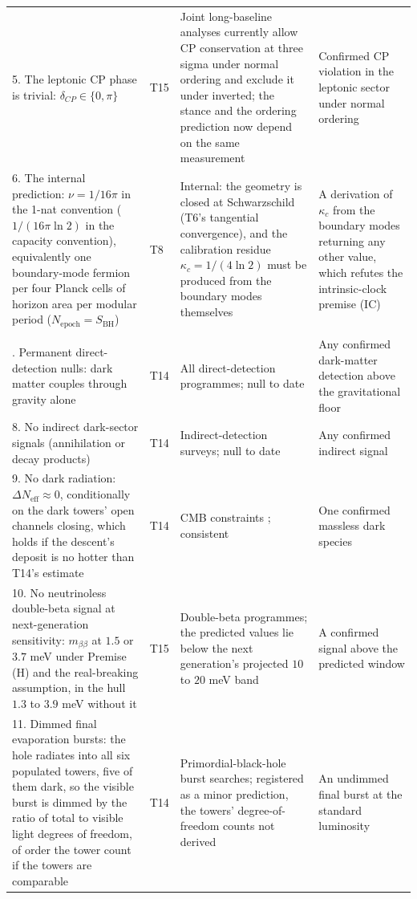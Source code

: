 \documentclass[11pt]{article}
\theoremstyle{definition}
\begin{document}
\begin{longtable}{p{} p{} p{} p{}}
5. The leptonic CP phase is trivial: $\delta_{CP} \in \{0, \pi\}$ & T15 & Joint long-baseline analyses currently allow CP conservation at three sigma under normal ordering and exclude it under inverted; the stance and the ordering prediction now depend on the same measurement & Confirmed CP violation in the leptonic sector under normal ordering \\
6. The internal prediction: $\nu = 1/16\pi$ in the 1-nat convention ($1/(16\pi\ln 2)$ in the capacity convention), equivalently one boundary-mode fermion per four Planck cells of horizon area per modular period ($N_{\mathrm{epoch}} = S_{\mathrm{BH}}$) & T8 & Internal: the geometry is closed at Schwarzschild (T6's tangential convergence), and the calibration residue $\kappa_{c} = 1/(4\ln 2)$ must be produced from the boundary modes themselves & A derivation of $\kappa_{c}$ from the boundary modes returning any other value, which refutes the intrinsic-clock premise (IC) \\
\addlinespace[4pt]
\multicolumn{4}{l}{\emph{Conditional absences (registered at the premises' level; continued nulls are consistent, one signal refutes)}}\\
\addlinespace[2pt]
7. Permanent direct-detection nulls: dark matter couples through gravity alone & T14 & All direct-detection programmes; null to date & Any confirmed dark-matter detection above the gravitational floor \\
8. No indirect dark-sector signals (annihilation or decay products) & T14 & Indirect-detection surveys; null to date & Any confirmed indirect signal \\
9. No dark radiation: $\Delta N_{\mathrm{eff}} \approx 0$, conditionally on the dark towers' open channels closing, which holds if the descent's deposit is no hotter than T14's estimate & T14 & CMB constraints \cite{Planck2018}; consistent & One confirmed massless dark species \\
10. No neutrinoless double-beta signal at next-generation sensitivity: $m_{\beta\beta}$ at $1.5$ or $3.7$ meV under Premise (H) and the real-breaking assumption, in the hull $1.3$ to $3.9$ meV without it & T15 & Double-beta programmes; the predicted values lie below the next generation's projected $10$ to $20$ meV band & A confirmed signal above the predicted window \\
11. Dimmed final evaporation bursts: the hole radiates into all six populated towers, five of them dark, so the visible burst is dimmed by the ratio of total to visible light degrees of freedom, of order the tower count if the towers are comparable & T14 & Primordial-black-hole burst searches; registered as a minor prediction, the towers' degree-of-freedom counts not derived & An undimmed final burst at the standard luminosity \\

\end{longtable}
\end{document}

